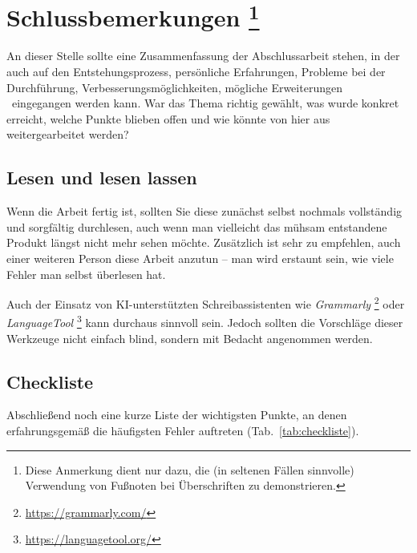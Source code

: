 \chapter[Schlussbemerkungen]{Schlussbemerkungen%
\protect\footnote{Diese Anmerkung dient nur dazu, die (in seltenen Fällen
sinnvolle) Verwendung von Fußnoten bei Überschriften zu demonstrieren.}}%
\label{cha:Schluss}

An dieser Stelle sollte eine Zusammenfassung der Abschlussarbeit stehen, in
der auch auf den Entstehungsprozess, persönliche Erfahrungen, Probleme bei
der Durchführung, Verbesserungsmöglichkeiten, mögliche Erweiterungen \usw\
eingegangen werden kann. War das Thema richtig gewählt, was wurde konkret
erreicht, welche Punkte blieben offen und wie könnte von hier aus
weitergearbeitet werden?


\section{Lesen und lesen lassen}

Wenn die Arbeit fertig ist, sollten Sie diese zunächst selbst nochmals
vollständig und sorgfältig durchlesen, auch wenn man vielleicht das mühsam
entstandene Produkt längst nicht mehr sehen möchte. Zusätzlich ist sehr zu
empfehlen, auch einer weiteren Person diese Arbeit anzutun -- man wird
erstaunt sein, wie viele Fehler man selbst überlesen hat.

Auch der Einsatz von KI-unterstützten Schreibassistenten wie \zB
\emph{Grammarly}%
\footnote{\url{https://grammarly.com/}} oder \emph{LanguageTool}%
\footnote{\url{https://languagetool.org/}} kann durchaus sinnvoll sein.
Jedoch sollten die Vorschläge dieser Werkzeuge nicht einfach blind, sondern
mit Bedacht angenommen werden.


\section{Checkliste}

Abschließend noch eine kurze Liste der wichtigsten Punkte, an denen
erfahrungsgemäß die häufigsten Fehler auftreten (Tab.\ \ref{tab:checkliste}).

